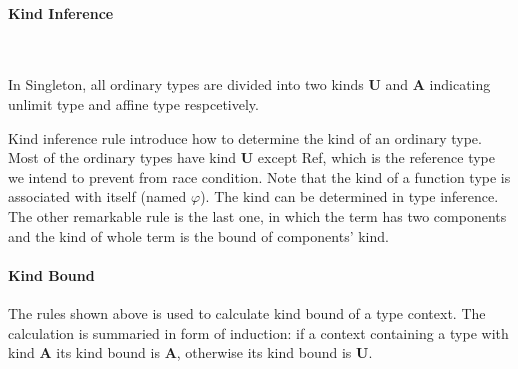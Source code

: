 \documentclass[10pt]{article}
\newcommand{\xto}{\xrightarrow}
\newcommand{\aless}{\preccurlyeq}
\let\emptyset\varnothing
\theoremstyle{definition}\newtheorem*{theorem}{Theorem}
\theoremstyle{definition}\newtheorem*{definition}{Definition}
\theoremstyle{definition}\newtheorem*{lemma}{Lemma}
\begin{document}
    \paragraph{Kind Inference} \mbox{} \\
    In Singleton, all ordinary types are divided into two kinds $\mathbf{U}$ and $\mathbf{A}$ indicating unlimit type and affine type respcetively.

    Kind inference rule introduce how to determine the kind of an ordinary type. Most of the ordinary types have kind $\mathbf{U}$ except Ref, which is the reference type we
    intend to prevent from race condition. Note that the kind of a function type is associated with itself (named $\varphi$). The kind can be determined in type inference.
    The other remarkable rule is the last one, in which the term has two components and the kind of whole term is the bound of components' kind.

    \paragraph{Kind Bound}
    The rules shown above is used to calculate kind bound of a type context. The calculation is summaried in form of induction: if a context containing a type with kind $\mathbf{A}$ its kind bound is $\mathbf{A}$, 
    otherwise its kind bound is $\mathbf{U}$.
\end{document}
